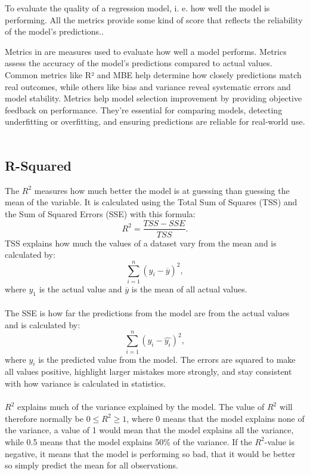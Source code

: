 To evaluate the quality of a regression model, i. e. how well the model is performing. All the metrics provide some kind of score that reflects the reliability of the model's predictions..

Metrics in are measures used to evaluate how well a model performs. Metrics assess the accuracy of the model’s predictions compared to actual values. Common metrics like R² and MBE help determine how closely predictions match real outcomes, while others like bias and variance reveal systematic errors and model stability. Metrics help model selection improvement by providing objective feedback on performance. They’re essential for comparing models, detecting underfitting or overfitting, and ensuring predictions are reliable for real-world use.
\\\\

\subsection{R-Squared}
The $R^2$ measures how much better the model is at guessing than guessing the mean of the variable. It is calculated using the Total Sum of Squares (TSS) and the Sum of Squared Errors (SSE) with this formula: $$R^2= \frac{TSS-SSE}{TSS}.$$ TSS explains how much the values of a dataset vary from the mean and is calculated by: 
$$\sum_{i=1}^{n}(y_i-\overline{y})^2,$$
where $y_1$ is the actual value and $\overline{y}$ is the mean of all actual values.
\\\\

\noindent The SSE is how far the predictions from the model are from the actual values and is calculated by:
$$\sum_{i=1}^{n}(y_i-\hat{y_i})^2,$$
where $\hat{y_i}$ is the predicted value from the model. The errors are squared to make all values positive, highlight larger mistakes more strongly, and stay consistent with how variance is calculated in statistics.
\\\\
$R^2$ explains much of the variance explained by the model. The value of $R^2$ will therefore normally be $0\leq R^2 \geq 1$, where 0 means that the model explains none of the variance, a value of 1 would mean that the model explains all the variance, while 0.5 means that the model explains 50\% of the variance. If the $R^2$-value is negative, it means that the model is performing so bad, that it would be better so simply predict the mean for all observations.
\newpage

